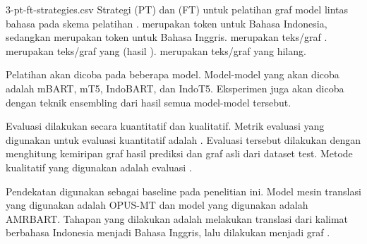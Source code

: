   {3-pt-ft-strategies.csv}
  {
    Strategi \pretraining{} (PT) dan \finetuning{} (FT) untuk pelatihan graf model \amrparsing{} lintas bahasa pada skema pelatihan .
     merupakan token untuk Bahasa Indonesia, sedangkan  merupakan token untuk Bahasa Inggris.
     merupakan teks/graf .
     merupakan teks/graf yang  (hasil \denoising{}).
     merupakan teks/graf yang hilang.
  }

Pelatihan \amrparsing{} akan dicoba pada beberapa \multil{} model.
Model-model yang akan dicoba adalah mBART, mT5, IndoBART, dan IndoT5.
Eksperimen \amrparsing{} juga akan dicoba dengan teknik \AMR{} ensembling  dari hasil semua model-model tersebut.

Evaluasi dilakukan secara kuantitatif dan kualitatif.
Metrik evaluasi yang digunakan untuk evaluasi kuantitatif adalah \SMATCH{}.
Evaluasi tersebut dilakukan dengan menghitung kemiripan graf \AMR{} hasil prediksi dan graf \AMR{} asli dari dataset test.
Metode kualitatif yang digunakan adalah evaluasi \transdiver{}.

Pendekatan   digunakan sebagai baseline pada penelitian ini.
Model mesin translasi yang digunakan adalah {OPUS-MT} dan model \amrparsing{} yang digunakan adalah \gls{AMRBART}.
Tahapan yang dilakukan adalah melakukan translasi dari kalimat berbahasa Indonesia menjadi Bahasa Inggris, lalu dilakukan \amrparsing{} menjadi graf \AMR{}.
